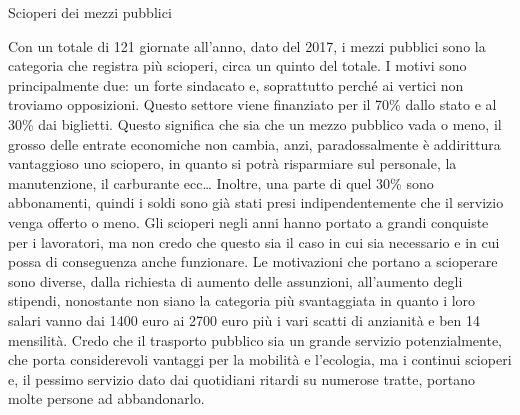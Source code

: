 \documentclass[12pt]{book} %
\begin{document}
\begin{mdframed}[linewidth=1pt]
Scioperi dei mezzi pubblici

Con un totale di 121 giornate all'anno, dato del 2017, i mezzi pubblici sono la categoria che
registra più scioperi, circa un quinto del totale. I motivi sono principalmente due: un forte sindacato e, soprattutto
perché ai vertici non troviamo opposizioni. Questo settore viene finanziato per il 70\% dallo stato e al 30\% dai
biglietti. Questo significa che sia che un mezzo pubblico vada o meno, il grosso delle entrate economiche non cambia,
anzi, paradossalmente è addirittura vantaggioso uno sciopero, in quanto si potrà risparmiare sul personale, la
manutenzione, il carburante ecc… Inoltre, una parte di quel 30\% sono abbonamenti, quindi i soldi sono già stati
presi indipendentemente che il servizio venga offerto o
meno. 
Gli scioperi negli anni hanno portato a grandi conquiste per i lavoratori, ma non credo che questo sia il caso in cui sia necessario e in cui possa
di conseguenza anche funzionare. Le motivazioni che portano a scioperare sono diverse, dalla richiesta di aumento delle
assunzioni, all'aumento degli stipendi, nonostante non siano la categoria più svantaggiata in
quanto i loro salari vanno dai 1400 euro ai 2700 euro più i vari scatti di anzianità
e ben 14 mensilità. Credo che il trasporto pubblico sia
un grande servizio potenzialmente, che porta considerevoli vantaggi per la mobilità e l'ecologia,
ma i continui scioperi e, il pessimo servizio dato dai quotidiani ritardi su numerose tratte, portano molte persone ad abbandonarlo.


\end{mdframed}
\end{document}
